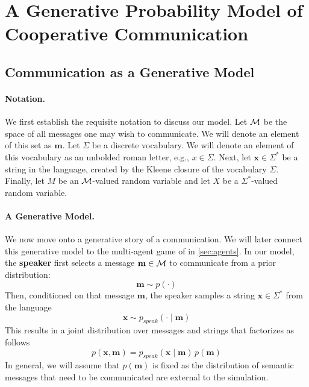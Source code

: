 \documentclass[11pt,a4paper]{article}
\newcommand{\xx}{\mathbf{x}}
\newcommand{\mm}{\mathbf{m}}
\newcommand{\pspeak}{p_{\textit{speak}}}
\newcommand{\defn}[1]{\textbf{#1}}
\newcommand{\calM}{{\cal M}}
\begin{document}
\section{A Generative Probability Model of Cooperative Communication}\label{sec:autoencoder}


\subsection{Communication as a Generative Model}
\paragraph{Notation.}
We first establish the requisite notation to discuss our model.
Let $\calM$ be the space of all messages one may wish to
communicate. We will denote an element of this set as $\mm$. Let $\Sigma$ be a discrete vocabulary. We will denote an element 
of this vocabulary as an unbolded roman letter, e.g., $x \in \Sigma$. Next, let $\xx \in \Sigma^*$ be a string in the language, created by the Kleene closure of the vocabulary $\Sigma$. Finally, let $M$ be an $\calM$-valued random variable and let $X$ be a $\Sigma^*$-valued random variable. 

\paragraph{A Generative Model.}
We now move onto a generative story of a communication.
We will later connect this generative model to the multi-agent
game of  in \cref{sec:agents}.
In our model, the \defn{speaker} first selects a message $\mm \in \calM$ to communicate from
a prior distribution:
\begin{equation}
\mm \sim p(\cdot)
\end{equation}
Then, conditioned on that message $\mm$, the speaker samples a string $\xx \in \Sigma^*$ from the language
\begin{equation}
\xx \sim \pspeak(\cdot \mid \mm)
\end{equation}
This results in a joint distribution over messages and strings
that factorizes as follows
\begin{equation}
p(\xx, \mm) = \pspeak(\xx \mid \mm)\, p(\mm)
\end{equation}
In general, we will assume that $p(\mm)$ is fixed as the distribution of semantic messages
that need to be communicated are external to the simulation. 
\end{document}
